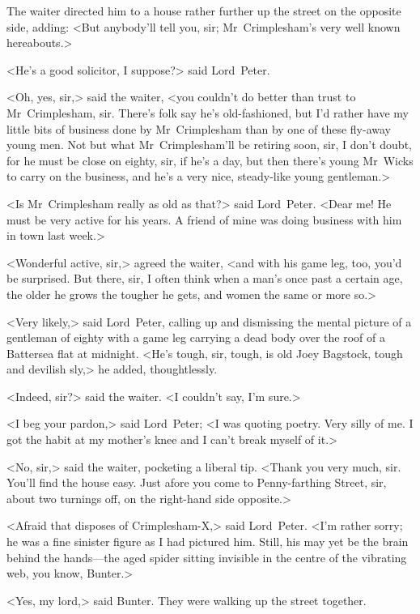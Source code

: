 The waiter directed him to a house rather further up the street on the opposite side, adding: <But anybody'll tell you, sir; Mr~Crimplesham's very well known hereabouts.>

<He's a good solicitor, I suppose?> said Lord~Peter.

<Oh, yes, sir,> said the waiter, <you couldn't do better than trust to Mr~Crimplesham, sir. There's folk say he's old-fashioned, but I'd rather have my little bits of business done by Mr~Crimplesham than by one of these fly-away young men. Not but what Mr~Crimplesham'll be retiring soon, sir, I don't doubt, for he must be close on eighty, sir, if he's a day, but then there's young Mr~Wicks to carry on the business, and he's a very nice, steady-like young gentleman.>

<Is Mr~Crimplesham really as old as that?> said Lord~Peter. <Dear me! He must be very active for his years. A friend of mine was doing business with him in town last week.>

<Wonderful active, sir,> agreed the waiter, <and with his game leg, too, you'd be surprised. But there, sir, I often think when a man's once past a certain age, the older he grows the tougher he gets, and women the same or more so.>

<Very likely,> said Lord~Peter, calling up and dismissing the mental picture of a gentleman of eighty with a game leg carrying a dead body over the roof of a Battersea flat at midnight. <He's tough, sir, tough, is old Joey Bagstock, tough and devilish sly,> he added, thoughtlessly.

<Indeed, sir?> said the waiter. <I couldn't say, I'm sure.>

<I beg your pardon,> said Lord~Peter; <I was quoting poetry. Very silly of me. I got the habit at my mother's knee and I can't break myself of it.>

<No, sir,> said the waiter, pocketing a liberal tip. <Thank you very much, sir. You'll find the house easy. Just afore you come to Penny-farthing Street, sir, about two turnings off, on the right-hand side opposite.>

<Afraid that disposes of Crimplesham-X\@,> said Lord~Peter. <I'm rather sorry; he was a fine sinister figure as I had pictured him. Still, his may yet be the brain behind the hands—the aged spider sitting invisible in the centre of the vibrating web, you know, Bunter.>

<Yes, my lord,> said Bunter. They were walking up the street together.

